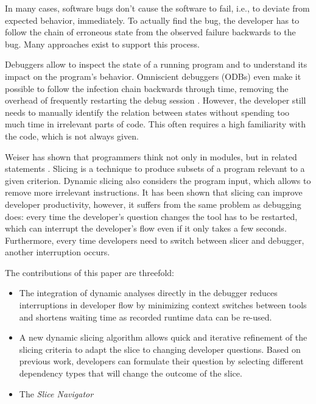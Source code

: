 ﻿\documentclass[
      english,
      ]{llncs}
\begin{document}
In many cases, software bugs don't cause the software to fail, i.e., to deviate from expected behavior, immediately.
To actually find the bug, the developer has to follow the chain of erroneous state from the observed failure backwards to the bug.
Many approaches exist to support this process.

Debuggers allow to inspect the state of a running program and to understand its impact on the program's behavior.
Omniscient debuggers (ODBs) even make it possible to follow the infection chain backwards through time, removing the overhead of frequently restarting the debug session \cite{lewis_debugging_2003}.
However, the developer still needs to manually identify the relation between states without spending too much time in irrelevant parts of code.
This often requires a high familiarity with the code, which is not always given.
%

Weiser has shown that programmers think not only in modules, but in related statements \cite{weiser_programmers_1982}.
Slicing is a technique to produce subsets of a program relevant to a given criterion.
Dynamic slicing also considers the program input, which allows to remove more irrelevant instructions.
It has been shown that slicing can improve developer productivity, however, it suffers from the same problem as debugging does:
every time the developer's question changes the tool has to be restarted, which can interrupt the developer's flow even if it only takes a few seconds.
Furthermore, every time developers need to switch between slicer and debugger, another interruption occurs.


The contributions of this paper are threefold:
\begin{itemize}
	\item The integration of dynamic analyses directly in the debugger reduces interruptions in developer flow by minimizing context switches between tools and shortens waiting time as recorded runtime data can be re-used.
	\item A new dynamic slicing algorithm allows quick and iterative refinement of the slicing criteria to adapt the slice to changing developer questions.
		Based on previous work, developers can formulate their question by selecting different dependency types that will change the outcome of the slice.
	\item The \emph{Slice Navigator} 
		
\end{itemize}
\end{document}
